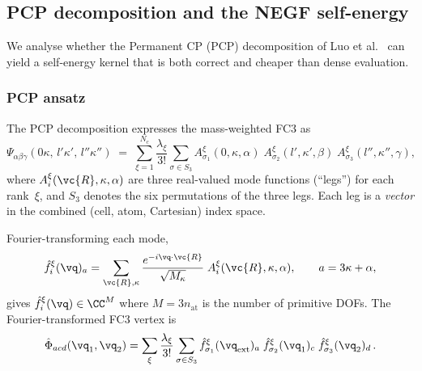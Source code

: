 \subsection{PCP decomposition and the NEGF self-energy}
\label{sub:pcp_selfenergy}

We analyse whether the Permanent CP (PCP) decomposition of Luo et
al.~\cite{luo_tensor_2025} can yield a self-energy kernel that is both
correct and cheaper than dense evaluation.


\subsubsection{PCP ansatz}
\label{sssub:pcp_ansatz}

The PCP decomposition expresses the mass-weighted FC3 as
\begin{equation}\label{eq:pcp_ansatz}
  \Psi_{\alpha\beta\gamma}(0\kappa,\, l'\kappa',\, l''\kappa'')
  \;=\; \sum_{\xi=1}^{N_c} \frac{\lambda_\xi}{3!}
  \sum_{\sigma\in S_3}
    A_{\sigma_1}^\xi(0,\kappa,\alpha)\;
    A_{\sigma_2}^\xi(l',\kappa',\beta)\;
    A_{\sigma_3}^\xi(l'',\kappa'',\gamma),
\end{equation}
where $A_i^\xi(\vc{R},\kappa,\alpha)$ are three real-valued mode
functions (``legs'') for each rank~$\xi$, and $S_3$ denotes the six
permutations of the three legs.  Each leg is a \emph{vector} in the
combined (cell, atom, Cartesian) index space.

Fourier-transforming each mode,
\begin{equation}\label{eq:pcp_ft}
  \hat{f}_i^\xi(\vq)_a
  = \sum_{\vc{R},\kappa}
    \frac{e^{-i\vq\cdot\vc{R}}}{\sqrt{M_\kappa}}\;
    A_i^\xi(\vc{R},\kappa,\alpha),
  \qquad a = 3\kappa + \alpha,
\end{equation}
gives $\hat{f}_i^\xi(\vq) \in \CC^M$ where $M = 3n_\mathrm{at}$ is
the number of primitive DOFs.  The Fourier-transformed FC3 vertex is
\begin{equation}\label{eq:pcp_vertex}
  \hat\Phi_{acd}(\vq_1,\vq_2)
  = \sum_{\xi} \frac{\lambda_\xi}{3!}
    \sum_{\sigma\in S_3}
    \hat{f}_{\sigma_1}^\xi(\vq_\mathrm{ext})_a\;
    \hat{f}_{\sigma_2}^\xi(\vq_1)_c\;
    \hat{f}_{\sigma_3}^\xi(\vq_2)_d\,.
\end{equation}


